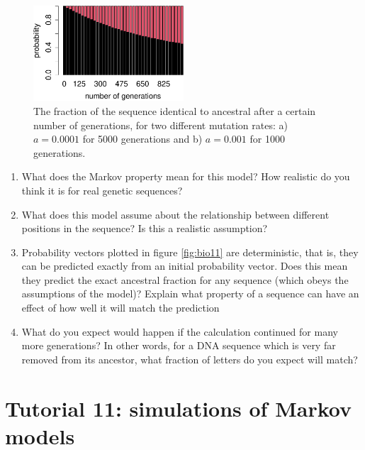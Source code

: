 \documentclass[
  letterpaper,
  DIV=11,
  numbers=noendperiod]{scrreprt}
\begin{document}
\begin{figure}

{\centering \includegraphics[width=0.5\textwidth,height=\textheight]{./markov_evol_files/figure-pdf/bio11-2.pdf}

}

\caption{The fraction of the sequence identical to ancestral after a
certain number of generations, for two different mutation rates: a)
\(a=0.0001\) for 5000 generations and b) \(a=0.001\) for 1000
generations.}

\end{figure}

\begin{enumerate}
\def\labelenumi{\arabic{enumi}.}
\item
  What does the Markov property mean for this model? How realistic do
  you think it is for real genetic sequences?
\item
  What does this model assume about the relationship between different
  positions in the sequence? Is this a realistic assumption?
\item
  Probability vectors plotted in figure \ref{fig:bio11} are
  deterministic, that is, they can be predicted exactly from an initial
  probability vector. Does this mean they predict the exact ancestral
  fraction for any sequence (which obeys the assumptions of the model)?
  Explain what property of a sequence can have an effect of how well it
  will match the prediction
\item
  What do you expect would happen if the calculation continued for many
  more generations? In other words, for a DNA sequence which is very far
  removed from its ancestor, what fraction of letters do you expect will
  match?
\end{enumerate}


\hypertarget{tutorial-11-simulations-of-markov-models}{%
\chapter*{Tutorial 11: simulations of Markov
models}\label{tutorial-11-simulations-of-markov-models}}
\end{document}
